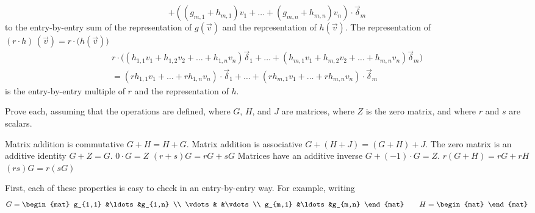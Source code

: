 \begin{exercises}
\begin{answer}
\begin{exparts}
\begin{equation*}
           +((g_{m,1}+h_{m,1})v_1+\dots+
                 (g_{m,n}+h_{m,n})v_n)\cdot\vec{\delta}_m
        \end{equation*} 
        to the entry-by-entry
        sum of the representation of \( g(\vec{v}) \) and the representation of
        \( h(\vec{v}) \).
      \partsitem The representation of
        $(r\cdot h)\,(\vec{v})=r\cdot \bigl(h(\vec{v})\bigr)$
        \begin{multline*}
          r\cdot \bigl(
               (h_{1,1}v_1+h_{1,2}v_2+\dots+h_{1,n}v_n)\vec{\delta}_1  
               +\dots      
               +(h_{m,1}v_1+h_{m,2}v_2+\dots+h_{m,n}v_n)\vec{\delta}_m\bigr) \\
          =(rh_{1,1}v_1+\dots+rh_{1,n}v_n)\cdot\vec{\delta}_1           
          +\dots                                    
          +(rh_{m,1}v_1+\dots+rh_{m,n}v_n)\cdot\vec{\delta}_m
        \end{multline*}
        is the  entry-by-entry
        multiple of \( r \) and the representation of \( h \).
     \end{exparts}  
   \end{answer}
  \recommended \item
    Prove each, assuming that the operations are defined, 
    where \( G \), \( H \), and 
    \( J \) are matrices, where
    \( Z \) is the zero matrix, and where \( r \) and \( s \) are scalars.
    \begin{exparts}
      \partsitem Matrix addition is commutative \( G+H=H+G \).
      \partsitem Matrix addition is associative \( G+(H+J)=(G+H)+J \).
      \partsitem The zero matrix is an additive identity \( G+Z=G \).
      \partsitem \( 0\cdot G=Z \)
      \partsitem \( (r+s)G=rG+sG \)
      \partsitem Matrices have an additive inverse \( G+(-1)\cdot G=Z \).
      \partsitem \( r(G+H)=rG+rH \)
      \partsitem \( (rs)G=r(sG) \)
    \end{exparts}
    \begin{answer}
      First, each of these properties
      is easy to check in an entry-by-entry way.
      For example, writing
      \begin{equation*}
        G=
        \begin{mat}
          g_{1,1}  &\ldots  &g_{1,n}  \\
          \vdots   &        &\vdots   \\
          g_{m,1}  &\ldots  &g_{m,n}       
        \end{mat}
        \qquad
        H=
        \begin{mat}

\end{mat}
\end{equation*}
\end{answer}
\end{exercises}
